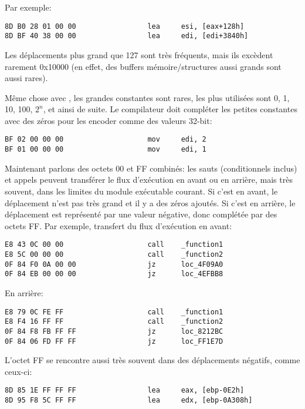 Par exemple:

\begin{lstlisting}[style=customasmx86]
8D B0 28 01 00 00                 lea     esi, [eax+128h]
8D BF 40 38 00 00                 lea     edi, [edi+3840h]
\end{lstlisting}

Les déplacements plus grand que 127 sont très fréquents, mais ils excèdent rarement
0x10000 (en effet, des buffers mémoire/structures aussi grands sont aussi rares).

Même chose avec , les grandes constantes sont rares, les plus utilisées sont
0, 1, 10, 100, $2^n$, et ainsi de suite.
Le compilateur doit compléter les petites constantes avec des zéros pour les encoder
comme des valeurs 32-bit:

\begin{lstlisting}[style=customasmx86]
BF 02 00 00 00                    mov     edi, 2
BF 01 00 00 00                    mov     edi, 1
\end{lstlisting}

Maintenant parlons des octets 00 et FF combinés: les sauts (conditionnels inclus)
et appels peuvent transférer le flux d'exécution en avant ou en arrière, mais très
souvent, dans les limites du module exécutable courant.
Si c'est en avant, le déplacement n'est pas très grand et il y a des zéros ajoutés.
Si c'est en arrière, le déplacement est représenté par une valeur négative, donc
complétée par des octets FF.
Par exemple, transfert du flux d'exécution en avant:

\begin{lstlisting}[style=customasmx86]
E8 43 0C 00 00                    call    _function1
E8 5C 00 00 00                    call    _function2
0F 84 F0 0A 00 00                 jz      loc_4F09A0
0F 84 EB 00 00 00                 jz      loc_4EFBB8
\end{lstlisting}

En arrière:

\begin{lstlisting}[style=customasmx86]
E8 79 0C FE FF                    call    _function1
E8 F4 16 FF FF                    call    _function2
0F 84 F8 FB FF FF                 jz      loc_8212BC
0F 84 06 FD FF FF                 jz      loc_FF1E7D
\end{lstlisting}

L'octet FF se rencontre aussi très souvent dans des déplacements négatifs, comme
ceux-ci:

\begin{lstlisting}[style=customasmx86]
8D 85 1E FF FF FF                 lea     eax, [ebp-0E2h]
8D 95 F8 5C FF FF                 lea     edx, [ebp-0A308h]
\end{lstlisting}

